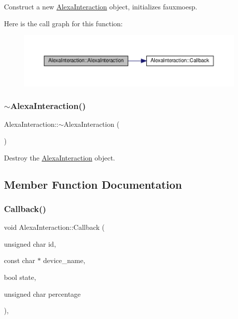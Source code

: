 Construct a new \hyperlink{classAlexaInteraction}{Alexa\+Interaction} object, initializes fauxmoesp. 

Here is the call graph for this function\+:
\nopagebreak
\begin{figure}[H]
\begin{center}
\leavevmode
\includegraphics[width=350pt]{classAlexaInteraction_acae42695173d2ad4b9296d64d4a2dbb2_cgraph}
\end{center}
\end{figure}
\mbox{\label{classAlexaInteraction_a469eb0982e4de6c665b46e4b510b2503}} 
\subsubsection{\texorpdfstring{$\sim$\+Alexa\+Interaction()}{~AlexaInteraction()}}
{\footnotesize\ttfamily Alexa\+Interaction\+::$\sim$\+Alexa\+Interaction (\begin{DoxyParamCaption}{ }\end{DoxyParamCaption})}



Destroy the \hyperlink{classAlexaInteraction}{Alexa\+Interaction} object. 



\subsection{Member Function Documentation}
\mbox{\label{classAlexaInteraction_a32ec2c496edced2e4e62d9c562fa9fa9}} 
\subsubsection{\texorpdfstring{Callback()}{Callback()}}
{\footnotesize\ttfamily void Alexa\+Interaction\+::\+Callback (\begin{DoxyParamCaption}\item[{unsigned char}]{id,  }\item[{const char $\ast$}]{device\+\_\+name,  }\item[{bool}]{state,  }\item[{unsigned char}]{percentage }\end{DoxyParamCaption})\hspace{0.3cm}{\ttfamily [static]}, {\ttfamily [private]}}



